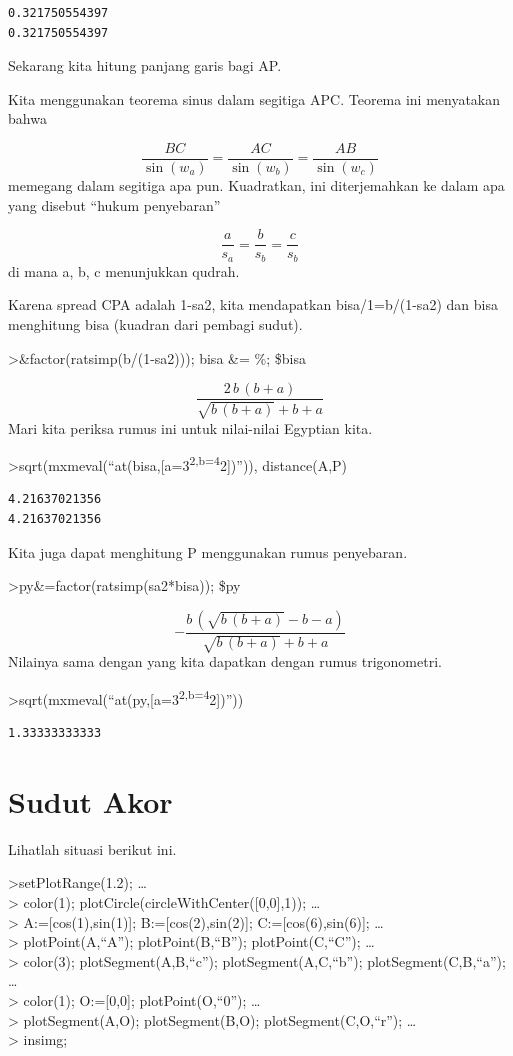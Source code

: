 \documentclass[
]{book}
\begin{document}
\begin{verbatim}
0.321750554397
0.321750554397
\end{verbatim}

Sekarang kita hitung panjang garis bagi AP.

Kita menggunakan teorema sinus dalam segitiga APC. Teorema ini menyatakan bahwa

\[\frac{BC}{\sin(w_a)} = \frac{AC}{\sin(w_b)} = \frac{AB}{\sin(w_c)}\]memegang dalam segitiga apa pun. Kuadratkan, ini diterjemahkan ke dalam apa yang disebut ``hukum penyebaran''

\[\frac{a}{s_a} = \frac{b}{s_b} = \frac{c}{s_b}\]di mana a, b, c menunjukkan qudrah.

Karena spread CPA adalah 1-sa2, kita mendapatkan bisa/1=b/(1-sa2) dan bisa menghitung bisa (kuadran dari pembagi sudut).

\textgreater\&factor(ratsimp(b/(1-sa2))); bisa \&= \%; \$bisa

\[\frac{2\,b\,\left(b+a\right)}{\sqrt{b\,\left(b+a\right)}+b+a}\]Mari kita periksa rumus ini untuk nilai-nilai Egyptian kita.

\textgreater sqrt(mxmeval(``at(bisa,{[}a=3\textsuperscript{2,b=4}2{]})'')), distance(A,P)

\begin{verbatim}
4.21637021356
4.21637021356
\end{verbatim}

Kita juga dapat menghitung P menggunakan rumus penyebaran.

\textgreater py\&=factor(ratsimp(sa2*bisa)); \$py

\[-\frac{b\,\left(\sqrt{b\,\left(b+a\right)}-b-a\right)}{\sqrt{b\,  \left(b+a\right)}+b+a}\]Nilainya sama dengan yang kita dapatkan dengan rumus trigonometri.

\textgreater sqrt(mxmeval(``at(py,{[}a=3\textsuperscript{2,b=4}2{]})''))

\begin{verbatim}
1.33333333333
\end{verbatim}

\section{Sudut Akor}\label{sudut-akor}

Lihatlah situasi berikut ini.

\textgreater setPlotRange(1.2); \ldots{}\\
\textgreater{} color(1); plotCircle(circleWithCenter({[}0,0{]},1)); \ldots{}\\
\textgreater{} A:={[}cos(1),sin(1){]}; B:={[}cos(2),sin(2){]}; C:={[}cos(6),sin(6){]}; \ldots{}\\
\textgreater{} plotPoint(A,``A''); plotPoint(B,``B''); plotPoint(C,``C''); \ldots{}\\
\textgreater{} color(3); plotSegment(A,B,``c''); plotSegment(A,C,``b''); plotSegment(C,B,``a''); \ldots{}\\
\textgreater{} color(1); O:={[}0,0{]}; plotPoint(O,``0''); \ldots{}\\
\textgreater{} plotSegment(A,O); plotSegment(B,O); plotSegment(C,O,``r''); \ldots{}\\
\textgreater{} insimg;
\end{document}
